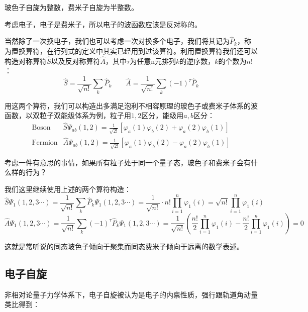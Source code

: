 玻色子自旋为整数，费米子自旋为半整数。

考虑电子，电子是费米子，所以电子的波函数应该是反对称的。

当然除了一次换电子，我们也可以考虑一次对换多个电子，我们将其记为$\hat{P}_k$，称为置换算符，在行列式的定义中其实已经用到过该算符。利用置换算符我们还可以构造对称算符$\hat{S}$以及反对称算符$\hat{A}$，其中$\tau$为任意n元排列$k$的逆序数，$k$的个数为$n!$：
\[\hat{S}=\frac{1}{\sqrt{n!}}\sum_{k}\hat{P}_{k} \qquad \hat{A}=\frac{1}{\sqrt{n!}}\sum_{k}(-1)^{\tau}\hat{P}_{k}\]

用这两个算符，我们可以构造出多满足泡利不相容原理的玻色子或费米子体系的波函数，以双粒子双能级体系为例，粒子用$1,2$区分，能级用$a,b$区分：
\[
    \begin{array}{ll}
        \text{Boson} & \hat{S}\varPsi_{ab}(1,2)=\frac{1}{\sqrt{2!}}[\varphi_a(1)\varphi_b(2)+\varphi_a(2)\varphi_b(1)]\\
        \text{Fermion} & \hat{A}\varPsi_{ab}(1,2)=\frac{1}{\sqrt{2!}}[\varphi_a(1)\varphi_b(2)-\varphi_a(2)\varphi_b(1)] 
    \end{array}
\]

考虑一件有意思的事情，如果所有粒子处于同一个量子态，玻色子和费米子会有什么样的行为？

我们这里继续使用上述的两个算符构造：
\[\hat{S}\varPsi_{1}(1,2,3 \cdots)=\frac{1}{\sqrt{n!}}\sum_{k}\hat{P}_{k}\varPsi_{1}(1,2,3 \cdots)=\frac{1}{\sqrt{n!}}\cdot n!\prod_{i=1}^n\varphi_1(i)=\sqrt{n!}\prod_{i=1}^n\varphi_1(i)\]
\[\hat{A}\varPsi_{1}(1,2,3 \cdots)=\frac{1}{\sqrt{n!}}\sum_{k}(-1)^{\tau}\hat{P}_{k}\varPsi_{1}(1,2,3 \cdots)=\frac{1}{\sqrt{n!}}\left (\frac{n!}{2}\prod_{i=1}^n\varphi_1(i)-\frac{n!}{2}\prod_{i=1}^n\varphi_1(i) \right )=0\]

这就是常听说的同态玻色子倾向于聚集而同态费米子倾向于远离的数学表述。

\subsection{电子自旋}
非相对论量子力学体系下，电子自旋被认为是电子的内禀性质，强行跟轨道角动量类比得到：

